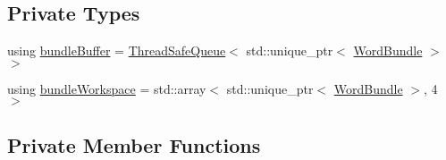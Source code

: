 \subsection*{Private Types}
\begin{DoxyCompactItemize}
\item 
using \hyperlink{class_file_reader_ac755c1e271610c2c12a7fc5b55cc048b}{bundle\+Buffer} = \hyperlink{class_thread_safe_queue}{Thread\+Safe\+Queue}$<$ std\+::unique\+\_\+ptr$<$ \hyperlink{class_word_bundle}{Word\+Bundle} $>$ $>$
\item 
using \hyperlink{class_file_reader_a7fb625dc45cee3256d37cc19c65cad86}{bundle\+Workspace} = std\+::array$<$ std\+::unique\+\_\+ptr$<$ \hyperlink{class_word_bundle}{Word\+Bundle} $>$, 4 $>$
\end{DoxyCompactItemize}
\subsection*{Private Member Functions}
